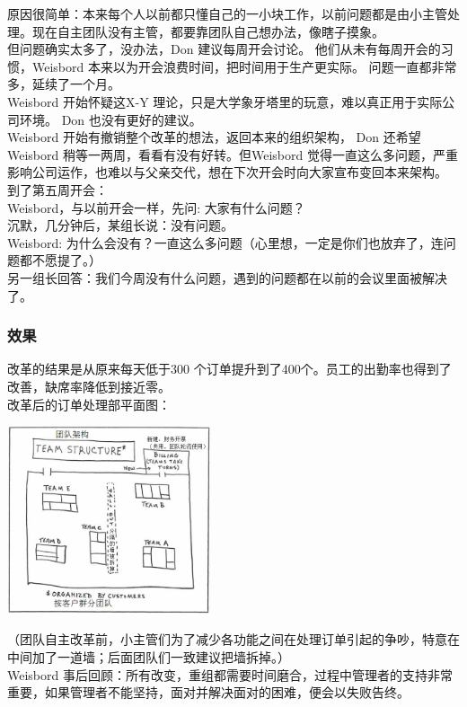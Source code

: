 原因很简单：本来每个人以前都只懂自己的一小块工作，以前问题都是由小主管处理。现在自主团队没有主管，都要靠团队自己想办法，像瞎子摸象。\\
但问题确实太多了，没办法，Don 建议每周开会讨论。
他们从未有每周开会的习惯，Weisbord
本来以为开会浪费时间，把时间用于生产更实际。
问题一直都非常多，延续了一个月。\\
Weisbord 开始怀疑这X-Y
理论，只是大学象牙塔里的玩意，难以真正用于实际公司环境。 Don
也没有更好的建议。\\
Weisbord 开始有撤销整个改革的想法，返回本来的组织架构， Don
还希望Weisbord 稍等一两周，看看有没有好转。但Weisbord
觉得一直这么多问题，严重影响公司运作，也难以与父亲交代，想在下次开会时向大家宣布变回本来架构。\\
到了第五周开会：\\
Weisbord，与以前开会一样，先问: 大家有什么问题？\\
沉默，几分钟后，某组长说：没有问题。\\
Weisbord:
为什么会没有？一直这么多问题（心里想，一定是你们也放弃了，连问题都不愿提了。）\\
另一组长回答：我们今周没有什么问题，遇到的问题都在以前的会议里面被解决了。\\

\hypertarget{ux6548ux679c}{%
\subsubsection{效果}\label{ux6548ux679c}}

改革的结果是从原来每天低于300
个订单提升到了400个。员工的出勤率也得到了改善，缺席率降低到接近零。\\
改革后的订单处理部平面图：


\includegraphics[width=6cm]{0A_Agile_stories_p51.jpg}

（团队自主改革前，小主管们为了减少各功能之间在处理订单引起的争吵，特意在中间加了一道墙；后面团队们一致建议把墙拆掉。）\\
Weisbord 
事后回顾：所有改变，重组都需要时间磨合，过程中管理者的支持非常重要，如果管理者不能坚持，面对并解决面对的困难，便会以失败告终。\\

